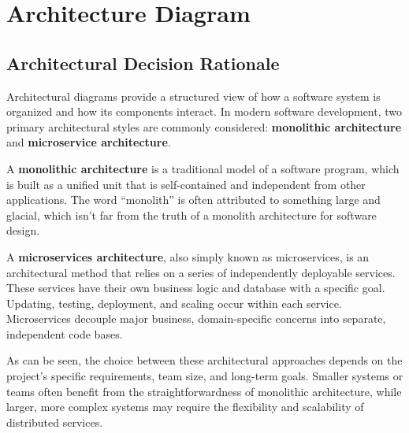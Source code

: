 \section{Architecture Diagram}
\subsection{Architectural Decision Rationale}
Architectural diagrams provide a structured view of how a software system is organized and how its components interact. In modern software development, two primary architectural styles are commonly considered: \textbf{monolithic architecture} and \textbf{microservice architecture}.

A \textbf{monolithic architecture} is a traditional model of a software program, which is built as a unified unit that is self-contained and independent from other applications. The word “monolith” is often attributed to something large and glacial, which isn’t far from the truth of a monolith architecture for software design. \cite{atlassian_microservices_vs_monolith}

A \textbf{microservices architecture}, also simply known as microservices, is an architectural method that relies on a series of independently deployable services. These services have their own business logic and database with a specific goal. Updating, testing, deployment, and scaling occur within each service. Microservices decouple major business, domain-specific concerns into separate, independent code bases. \cite{atlassian_microservices_vs_monolith}

As can be seen, the choice between these architectural approaches depends on the project’s specific requirements, team size, and long-term goals. Smaller systems or teams often benefit from the straightforwardness of monolithic architecture, while larger, more complex systems may require the flexibility and scalability of distributed services.

